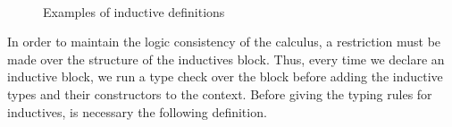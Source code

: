 \begin{figure}
    \begin{CoqDef}
    \\
    
          
    
    \IndIntro[0][
              \typing{\Indnat}{\Type[0]}][
              \typing{\ConsO}{\Indnat},\typing{\ConsS}{\arrow{\Indnat}{\Indnat}}]
              
    \end{CoqDef}
    \caption{Examples of inductive definitions}
    \label{fig:InductivesExample}
\end{figure}

In order to maintain the logic consistency of the calculus, a restriction must be made over the structure of 
the inductives block. Thus, every time we declare an inductive block, we run a type check over the block
before adding the inductive types and their constructors to the context. Before giving the 
typing rules for inductives, is necessary the following definition.

